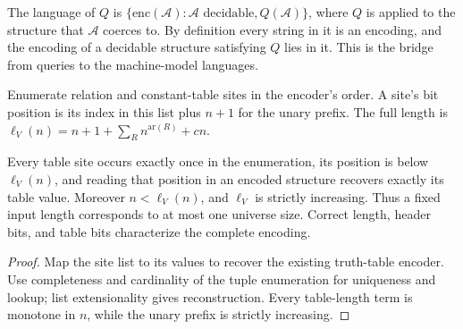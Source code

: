 \begin{definition}
  \label{def:desc-query-language}
  \leanok
  The language of $Q$ is
  $\{\mathrm{enc}(\mathcal{A}) : \mathcal{A} \text{ decidable}, Q(\mathcal{A})\}$,
  where $Q$ is applied to the structure that $\mathcal{A}$ coerces to. By
  definition every string in it is an encoding, and the encoding of a decidable
  structure satisfying $Q$ lies in it. This is the bridge from queries to the
  machine-model languages.
\end{definition}

\begin{definition}
  \label{def:desc-encoding-positions}
  \leanok
  Enumerate relation and constant-table sites in the encoder's order.
  A site's bit position is its index in this list plus $n+1$ for the unary
  prefix. The full length is $\ell_V(n)=n+1+\sum_R n^{\mathrm{ar}(R)}+cn$.
\end{definition}

\begin{theorem}
  \label{thm:desc-encoding-positions}
  \leanok
  Every table site occurs exactly once in the enumeration, its position is below
  $\ell_V(n)$, and reading that position in an encoded structure recovers
  exactly its table value. Moreover $n<\ell_V(n)$, and $\ell_V$ is strictly
  increasing. Thus a fixed input length corresponds to at most one universe size.
  Correct length, header bits, and table bits characterize the complete encoding.
\end{theorem}
\begin{proof}
  \leanok
  Map the site list to its values to recover the existing truth-table encoder.
  Use completeness and cardinality of the tuple enumeration for uniqueness and
  lookup; list extensionality gives reconstruction. Every table-length term is
  monotone in $n$, while the unary prefix is strictly increasing.
\end{proof}


